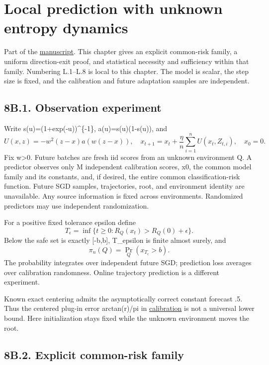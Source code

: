 \section{Local prediction with unknown entropy
dynamics}\label{local_prediction-local-prediction-with-unknown-entropy-dynamics}

Part of the \href{DRAFT.md}{manuscript}. This chapter gives an explicit
common-risk family, a uniform direction-exit proof, and statistical
necessity and sufficiency within that family. Numbering L.1--L.8 is
local to this chapter. The model is scalar, the step size is fixed, and
the calibration and future adaptation samples are independent.

\subsection{8B.1. Observation
experiment}\label{local_prediction-b.1.-observation-experiment}

Write s(u)=(1+exp(-u))\^{}\{-1\}, a(u)=s(u)(1-s(u)), and \[
U(x,z)=-w^2(z-x)a(w(z-x)),\quad
x_{t+1}=x_t+\frac\eta n\sum_{i=1}^n U(x_t,Z_{t,i}),\quad x_0=0.
\] Fix w\textgreater0. Future batches are fresh iid scores from an
unknown environment Q. A predictor observes only M independent
calibration scores, x0, the common model family and its constants, and,
if desired, the entire common classification-risk function. Future SGD
samples, trajectories, root, and environment identity are unavailable.
Any source information is fixed across environments. Randomized
predictors may use independent randomization.

For a positive fixed tolerance epsilon define \[
T_\epsilon=\inf\{t\ge0:R_Q(x_t)>R_Q(0)+\epsilon\}.
\] Below the safe set is exactly {[}-b,b{]}, T\_epsilon is finite almost
surely, and \[
\pi_n(Q)=\Pr_Q(x_{T_\epsilon}>b).
\] The probability integrates over independent future SGD; prediction
loss averages over calibration randomness. Online trajectory prediction
is a different experiment.

Known exact centering admits the asymptotically correct constant
forecast .5. Thus the centered plug-in error arctan(r)/pi in
\href{calibration.md}{calibration} is not a universal lower bound. Here
initialization stays fixed while the unknown environment moves the root.

\subsection{8B.2. Explicit common-risk
family}\label{local_prediction-b.2.-explicit-common-risk-family}

